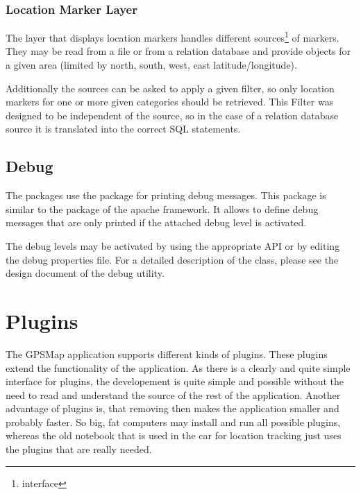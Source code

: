 \documentclass[a4paper]{article} %
\begin{document}
\subsubsection{Location Marker Layer}
\label{SoftwareDesignOfTheGpstoolPackage-LocationMarkerLayer}

The layer that displays location markers handles different
sources\footnote{interface
}
of markers. They may be read from a file or from a relation database
and provide  objects for a given area
(limited by north, south, west, east latitude/longitude).

Additionally the sources can be asked to apply a given filter, so only
location markers for one or more given categories should be
retrieved. This Filter was designed to be independent of the source,
so in the case of a relation database source it is translated into the
correct SQL statements.


\subsection{Debug}
\label{SoftwareDesignOfTheGpstoolPackage-Debug}

The  packages use the
 package for printing debug
messages. This package is similar to the  package
of the apache framework. It allows to define debug messages that are
only printed if the attached debug level is activated.

The debug levels may be activated by using the appropriate API or by
editing the debug properties file. For a detailed description of the
 class, please see the design document of the debug
utility. 

\section{Plugins}
\label{SoftwareDesignOfTheGpstoolPackage-Plugins}

The GPSMap application supports different kinds of plugins. These
plugins extend the functionality of the application. As there is a
clearly and quite simple interface for plugins, the developement is
quite simple and possible without the need to read and understand the
source of the rest of the application. Another advantage of plugins
is, that removing then makes the application smaller and probably
faster. So big, fat computers may install and run all possible
plugins, whereas the old notebook that is used in the car for location
tracking just uses the plugins that are really needed. 
\end{document}
